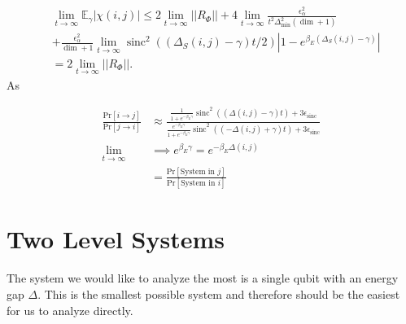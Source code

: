 \documentclass{article}
\newcommand{\abs}[1]{\left| #1 \right|}
\newcommand{\norm}[1]{\left| \left| #1 \right| \right|}
\newcommand{\prob}[1]{\text{Pr}\left[ #1 \right]}
\DeclareMathOperator{\sinc}{sinc}
\begin{document}
\begin{align}
    &\lim_{t \to \infty} \mathbb{E}_{\gamma} \abs{\chi(i,j)} \leq 2 \lim_{t \to \infty} \norm{R_{\Phi}} + 4 \lim_{t \to \infty} \frac{\epsilon_{\alpha}^2}{t^2 \Delta_{\min}^2 (\dim + 1)} \nonumber \\
    &+ \frac{\epsilon_{\alpha}^2}{\dim + 1} \lim_{t \to \infty} \sinc^2((\Delta_S(i,j) - \gamma)t/2) \abs{1 - e^{\beta_E(\Delta_S(i,j) - \gamma)}} \\
    &= 2 \lim_{t \to \infty} \norm{R_{\Phi}}.
\end{align}
As 

\begin{align}
    \frac{\prob{i \to j}}{\prob{j \to i}} &\approx \frac{\frac{1}{1 + e^{-\beta_E \gamma}}\sinc^2 ((\Delta(i,j) - \gamma)t)+ 3 \epsilon_{\sinc}}{\frac{e^{-\beta_E \gamma}}{1 + e^{-\beta_E \gamma}} \sinc^2((-\Delta(i,j) + \gamma)t) + 3 \epsilon_{\sinc}}  \nonumber \\
    \lim_{t \to \infty} &\implies e^{\beta_E \gamma} = e^{-\beta_E \Delta(i,j)} \nonumber \\
    &= \frac{\prob{\text{System in } j}}{ \prob{\text{System in } i}} \nonumber
\end{align}

\section{Two Level Systems}
The system we would like to analyze the most is a single qubit with an energy gap $\Delta$. This is the smallest possible system and therefore should be the easiest for us to analyze directly. 
\end{document}
